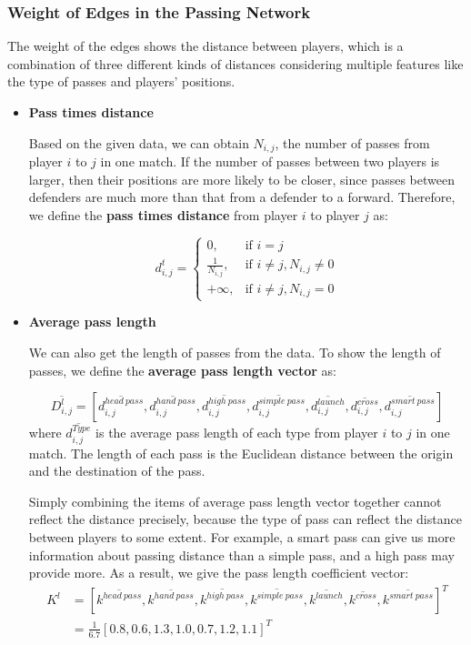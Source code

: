 \documentclass{mcmthesis}
\begin{document}
\subsubsection{Weight of Edges in the Passing Network}
The weight of the edges shows the distance between players, which is a combination of three different kinds of distances considering multiple features like the type of passes and players' positions.
\begin{itemize}
  \item \textbf{Pass times distance}

  \qquad Based on the given data, we can obtain $N_{i,j}$, the number of passes from player $i$ to $j$ in one match. If the number of passes between two players is larger, then their positions are more likely to be closer, since passes between defenders are much more than that from a defender to a forward. Therefore, we define the \textbf{pass times distance} from player $i$ to player $j$ as:

\begin{equation}\label{dt}
d_{i,j}^{t}=
\begin{cases}
  0, & \mbox{if } i=j \\
  \frac{1}{N_{i,j}}, & \mbox{if } i\ne j, N_{i,j} \ne 0 \\
  +\infty, & \mbox{if } i\ne j, N_{i,j} = 0
\end{cases}
\end{equation}
  \item \textbf{Average pass length}

 \qquad We can also get the length of passes from the data. To show the length of passes, we define the \textbf{average pass length vector} as:

$$
\overline{D_{i,j}^l} = \left[\overline{d_{i,j}^{head\ pass}}, \overline{d_{i,j}^{hand\ pass}},\overline{d_{i,j}^{high\ pass}},\overline{d_{i,j}^{simple\ pass}},\overline{d_{i,j}^{launch}},\overline{d_{i,j}^{cross}},\overline{d_{i,j}^{smart\ pass}}\right]
$$
where  $\overline{d_{i,j}^{Type}}$ is the average pass length of each type from player $i$ to $j$ in one match. The length of each pass is the Euclidean distance between the origin and the destination of the pass.

\qquad Simply combining the items of average pass length vector together cannot reflect the distance precisely, because the type of pass can reflect the distance between players to some extent. For example, a smart pass can give us more information about passing distance than a simple pass, and a high pass may provide more. As a result, we give the pass length coefficient vector:
 $$
\begin{aligned}
  K^l&=\left[\overline{k^{head\ pass}}, \overline{k^{hand\ pass}},\overline{k^{high\ pass}},\overline{k^{simple\ pass}},\overline{k^{launch}},\overline{k^{cross}},\overline{k^{smart\ pass}}\right]^T \\
    & = \frac{1}{6.7}[0.8, 0.6, 1.3, 1.0, 0.7, 1.2, 1.1]^T
\end{aligned}$$


\end{itemize}
\end{document}
